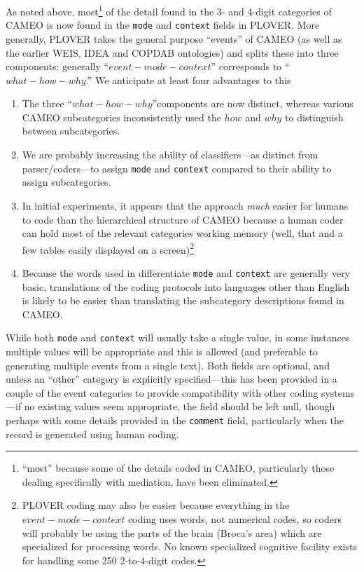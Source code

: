 \documentclass[11pt]{report}
\newcommand{\fn}[1]{\footnote{#1}}
\begin{document}
As noted above, most\fn{``most'' because some of the details coded in CAMEO, particularly those dealing specifically with mediation, have been eliminated.} of the detail found in the 3- and 4-digit categories of CAMEO is now found in the \texttt{mode} and  \texttt{context} fields in PLOVER. More generally, PLOVER takes the general purpose ``events'' of CAMEO (as well as the earlier WEIS, IDEA and COPDAB ontologies) and splits these into three components: generally ``$event-mode-context$'' corresponds to ``$what-how-why$.'' We anticipate at least four advantages to this
\begin{enumerate}
\item The three ``$what-how-why$''components are now distinct, whereas various CAMEO subcategories inconsistently used the $how$ and $why$ to distinguish between subcategories.
\item We are probably increasing the ability of classifiers---as distinct from parser/coders---to assign \texttt{mode} and \texttt{context} compared to their ability to assign subcategories.
\item In initial experiments, it appears that the  approach \textit{much} easier for humans to code than the hierarchical structure of CAMEO because a human coder can hold most of the relevant categories working memory (well, that and a few tables easily displayed on a screen)\footnote{PLOVER coding may also be easier because everything in the $event-mode-context$ coding uses words, not numerical codes, so coders will probably be using the parts of the brain (Broca's area) which are specialized for processing words. No known specialized cognitive facility exists for handling some 250 2-to-4-digit codes.}
\item Because the words used in differentiate \texttt{mode} and \texttt{context} are generally very basic, translations of the coding protocols into languages other than English is likely to be easier than translating the subcategory descriptions found in CAMEO. 
\end{enumerate}

While both \texttt{mode} and \texttt{context} will usually take a single value, in some instances multiple values will be appropriate and this is allowed (and preferable to generating multiple events from a single text). Both fields are optional, and unless an ``other'' category is explicitly specified---this has been provided in a couple of the event categories to provide compatibility with other coding systems---if no existing values seem appropriate, the field should be left null, though perhaps with some details provided in the \texttt{comment} field, particularly when the record is generated using human coding.
\end{document}
